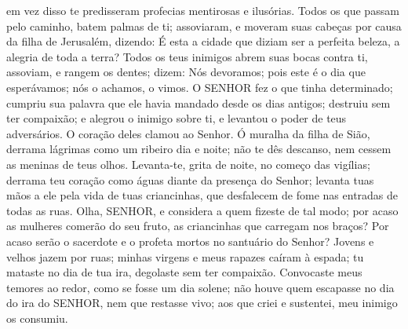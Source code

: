 { em vez disso te predisseram profecias mentirosas e ilusórias.
  Todos os que passam pelo caminho, batem palmas
{} de ti; assoviaram, e moveram suas cabeças por causa da filha de Jerusalém, dizendo: É esta a cidade que diziam ser a perfeita beleza, a alegria de toda a terra?
  Todos os teus inimigos abrem suas bocas contra ti, assoviam, e rangem os dentes; dizem: Nós
{} devoramos; pois este é o dia que esperávamos; nós o achamos,
{} o vimos.
  O SENHOR fez o que tinha determinado; cumpriu sua palavra que ele havia mandado desde os dias antigos; destruiu sem ter compaixão; e alegrou o inimigo sobre ti, e levantou o poder
 de teus adversários.
  O coração deles clamou ao Senhor. Ó muralha da filha de Sião, derrama lágrimas como um ribeiro dia e noite; não te dês descanso, nem cessem as meninas de teus olhos.
  Levanta-te, grita de noite, no começo das vigílias; derrama teu coração como águas diante da presença do Senhor; levanta tuas mãos a ele pela vida de tuas criancinhas, que desfalecem de fome nas entradas de todas as ruas.
  Olha, SENHOR, e considera a quem fizeste de tal modo; por acaso as mulheres comerão do seu
{} fruto, as criancinhas que carregam nos braços? Por acaso serão o sacerdote e o profeta mortos no santuário do Senhor?
  Jovens e velhos jazem por
{} ruas; minhas virgens e meus rapazes caíram à espada; tu
{} mataste no dia de tua ira, degolaste sem ter compaixão.
  Convocaste meus temores ao redor, como se fosse um dia solene; não houve quem escapasse no dia do ira do SENHOR, nem que restasse vivo; aos que criei e sustentei, meu inimigo os consumiu.
\par }

